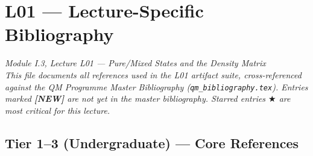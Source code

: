 \documentclass[11pt,a4paper]{article}
\begin{document}
\section*{L01 --- Lecture-Specific Bibliography}
\begin{center}
  \textit{Module I.3, Lecture L01 --- Pure/Mixed States and the Density Matrix}\\[6pt]
  \textit{This file documents all references used in the L01 artifact suite,
  cross-referenced against the QM Programme Master Bibliography (\texttt{qm\_bibliography.tex}).
  Entries marked \textbf{[NEW]} are not yet in the master bibliography.
  Starred entries $\bigstar$ are most critical for this lecture.}
\end{center}

\bigskip

\subsection*{Tier 1--3 (Undergraduate) --- Core References}
\end{document}
